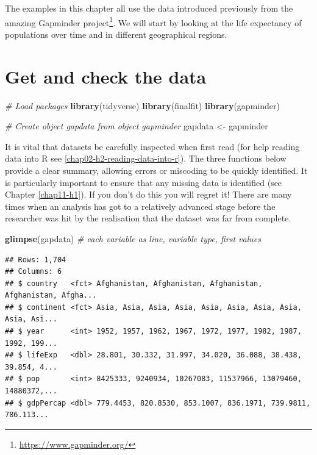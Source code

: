 \documentclass[
  12pt,
  krantz2]{krantz}
\makeatletter
\newenvironment{Shaded}{\begin{snugshade}}{\end{snugshade}}
\newcommand{\CommentTok}[1]{\textcolor[rgb]{0.56,0.35,0.01}{\textit{#1}}}
\newcommand{\KeywordTok}[1]{\textcolor[rgb]{0.13,0.29,0.53}{\textbf{#1}}}
\newcommand{\NormalTok}[1]{#1}
\newcommand{\StringTok}[1]{\textcolor[rgb]{0.31,0.60,0.02}{#1}}
\renewcommand{\href}[2]{#2\footnote{\url{#1}}}
\newenvironment{kframe}{%
\medskip{}
\setlength{\fboxsep}{.8em}
 \def\at@end@of@kframe{}%
 \ifinner\ifhmode%
  \def\at@end@of@kframe{\end{minipage}}%
  \begin{minipage}{\columnwidth}%
 \fi\fi%
 \def\FrameCommand##1{\hskip\@totalleftmargin \hskip-\fboxsep
 \colorbox{shadecolor}{##1}\hskip-\fboxsep
     \hskip-\linewidth \hskip-\@totalleftmargin \hskip\columnwidth}%
 \MakeFramed {\advance\hsize-\width
   \@totalleftmargin\z@ \linewidth\hsize
   \@setminipage}}%
 {\par\unskip\endMakeFramed%
 \at@end@of@kframe}
\renewenvironment{Shaded}{\begin{kframe}}{\end{kframe}}
\makeatother
\begin{document}
The examples in this chapter all use the data introduced previously from the amazing \href{https://www.gapminder.org/}{Gapminder project}.
We will start by looking at the life expectancy of populations over time and in different geographical regions.

\hypertarget{chap06-h2-check}{%
\section{Get and check the data}\label{chap06-h2-check}}

\begin{Shaded}
\begin{Highlighting}[]
\CommentTok{# Load packages}
\KeywordTok{library}\NormalTok{(tidyverse)}
\KeywordTok{library}\NormalTok{(finalfit)}
\KeywordTok{library}\NormalTok{(gapminder)}

\CommentTok{# Create object gapdata from object gapminder}
\NormalTok{gapdata <-}\StringTok{ }\NormalTok{gapminder}
\end{Highlighting}
\end{Shaded}

It is vital that datasets be carefully inspected when first read (for help reading data into R see \ref{chap02-h2-reading-data-into-r}).
The three functions below provide a clear summary, allowing errors or miscoding to be quickly identified.
It is particularly important to ensure that any missing data is identified (see Chapter \ref{chap11-h1}).
If you don't do this you will regret it!
There are many times when an analysis has got to a relatively advanced stage before the researcher was hit by the realisation that the dataset was far from complete.

\begin{Shaded}
\begin{Highlighting}[]
\KeywordTok{glimpse}\NormalTok{(gapdata) }\CommentTok{# each variable as line, variable type, first values}
\end{Highlighting}
\end{Shaded}

\begin{verbatim}
## Rows: 1,704
## Columns: 6
## $ country   <fct> Afghanistan, Afghanistan, Afghanistan, Afghanistan, Afgha...
## $ continent <fct> Asia, Asia, Asia, Asia, Asia, Asia, Asia, Asia, Asia, Asi...
## $ year      <int> 1952, 1957, 1962, 1967, 1972, 1977, 1982, 1987, 1992, 199...
## $ lifeExp   <dbl> 28.801, 30.332, 31.997, 34.020, 36.088, 38.438, 39.854, 4...
## $ pop       <int> 8425333, 9240934, 10267083, 11537966, 13079460, 14880372,...
## $ gdpPercap <dbl> 779.4453, 820.8530, 853.1007, 836.1971, 739.9811, 786.113...
\end{verbatim}
\end{document}
